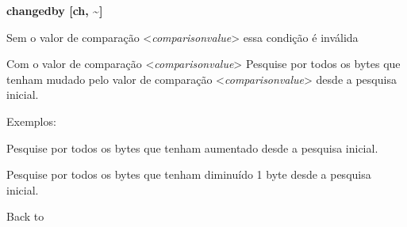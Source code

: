 \documentclass[letterpaper,10pt,brazil]{sphinxmanual}
\begin{document}
\begin{DUlineblock}{0em}
\item[] 
\item[]
\begin{DUlineblock}{\DUlineblockindent}
\item[] \textbf{changedby {[}ch, \textasciitilde{}{]}}
\item[] 
\end{DUlineblock}
\item[] Sem o valor de comparação \textless{}\emph{comparisonvalue}\textgreater{} essa condição é inválida
\item[] Com o valor de comparação \textless{}\emph{comparisonvalue}\textgreater{} Pesquise por todos os bytes que tenham mudado pelo valor de comparação \textless{}\emph{comparisonvalue}\textgreater{} desde a pesquisa inicial.
\item[] 
\item[] 
\item[] Exemplos:
\item[] 
\item[]
\begin{DUlineblock}{\DUlineblockindent}
\item[] 
\item[] 
\end{DUlineblock}
\item[] Pesquise por todos os bytes que tenham aumentado desde a pesquisa inicial.
\item[] 
\item[]
\begin{DUlineblock}{\DUlineblockindent}
\item[] 
\item[] 
\end{DUlineblock}
\item[] Pesquise por todos os bytes que tenham diminuído 1 byte desde a pesquisa inicial.
\item[] 
\item[] Back to {\hyperref[debugger/cheats:debugger\string-cheats\string-list]{}}
\end{DUlineblock}
\begin{quote}
\label{debugger/cheats:debugger-command-cheatlist}\end{quote}
\end{document}
